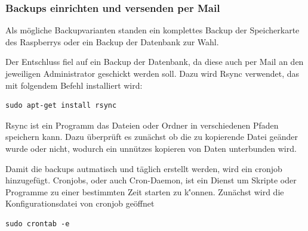 \documentclass[11pt,a4paper]{article} %
\begin{document}
\subsubsection{Backups einrichten und versenden per Mail}
Als m\"ogliche Backupvarianten standen ein komplettes Backup der Speicherkarte des Raspberrys oder ein Backup der Datenbank zur Wahl.
\par
Der Entschluss fiel auf ein Backup der Datenbank, da diese auch per Mail an den jeweiligen Administrator geschickt werden soll. Dazu wird Rsync verwendet, das mit folgendem Befehl installiert wird:
\begin{frame}

\begin{lstlisting}
sudo apt-get install rsync
\end{lstlisting}
\end{frame}
 Rsync ist ein Programm das Dateien oder Ordner in verschiedenen Pfaden speichern kann. Dazu \"uberpr\"uft es zun\"achst ob die zu kopierende Datei ge\"ander wurde oder nicht, wodurch ein unn\"utzes kopieren von Daten unterbunden wird.
\par
Damit die backups autmatisch und t\"aglich erstellt werden, wird ein cronjob hinzugef\"ugt. Cronjobs, oder auch Cron-Daemon, ist ein Dienst um Skripte oder Programme zu einer bestimmten Zeit starten zu k\''onnen. Zunächst wird die Konfigurationsdatei von cronjob geöffnet
\begin{frame}

\begin{lstlisting}
sudo crontab -e
\end{lstlisting}
\end{frame}
\end{document}

